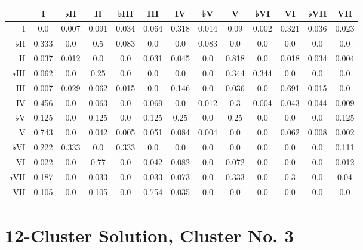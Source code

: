 \begin{table}[htbp]
\begin{minipage}{\linewidth}
\setlength{\tymax}{0.5\linewidth}
\centering
\small
\begin{tabulary}{\textwidth}{@{}RCCCCCCCCCCCC@{}} \toprule
&I&♭II&II&♭III&III&IV&♭V&V&♭VI&VI&♭VII&VII\\
\midrule
I&0.0&0.007&0.091&0.034&0.064&0.318&0.014&0.09&0.002&0.321&0.036&0.023\\
♭II&0.333&0.0&0.5&0.083&0.0&0.0&0.083&0.0&0.0&0.0&0.0&0.0\\
II&0.037&0.012&0.0&0.0&0.031&0.045&0.0&0.818&0.0&0.018&0.034&0.004\\
♭III&0.062&0.0&0.25&0.0&0.0&0.0&0.0&0.344&0.344&0.0&0.0&0.0\\
III&0.007&0.029&0.062&0.015&0.0&0.146&0.0&0.036&0.0&0.691&0.015&0.0\\
IV&0.456&0.0&0.063&0.0&0.069&0.0&0.012&0.3&0.004&0.043&0.044&0.009\\
♭V&0.125&0.0&0.125&0.0&0.125&0.25&0.0&0.25&0.0&0.0&0.0&0.125\\
V&0.743&0.0&0.042&0.005&0.051&0.084&0.004&0.0&0.0&0.062&0.008&0.002\\
♭VI&0.222&0.333&0.0&0.333&0.0&0.0&0.0&0.0&0.0&0.0&0.0&0.111\\
VI&0.022&0.0&0.77&0.0&0.042&0.082&0.0&0.072&0.0&0.0&0.0&0.012\\
♭VII&0.187&0.0&0.033&0.0&0.033&0.073&0.0&0.333&0.0&0.3&0.0&0.04\\
VII&0.105&0.0&0.105&0.0&0.754&0.035&0.0&0.0&0.0&0.0&0.0&0.0\\

\bottomrule

\end{tabulary}
\end{minipage}
\end{table}

\section{12-Cluster Solution, Cluster No. 3}
\label{12-clustersolutionclusterno.3}

